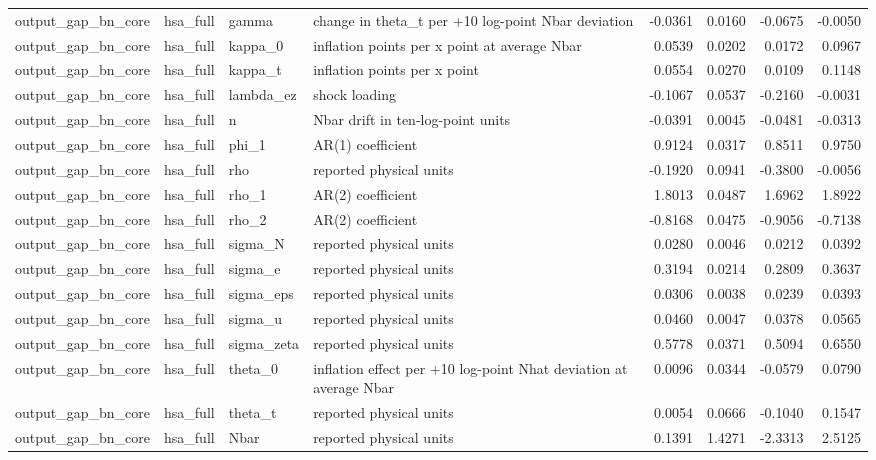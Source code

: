 \begin{tabular}{llllrrrr}
output\_gap\_bn\_core & hsa\_full & gamma & change in theta\_t per +10 log-point Nbar deviation & -0.0361 & 0.0160 & -0.0675 & -0.0050 \\
output\_gap\_bn\_core & hsa\_full & kappa\_0 & inflation points per x point at average Nbar & 0.0539 & 0.0202 & 0.0172 & 0.0967 \\
output\_gap\_bn\_core & hsa\_full & kappa\_t & inflation points per x point & 0.0554 & 0.0270 & 0.0109 & 0.1148 \\
output\_gap\_bn\_core & hsa\_full & lambda\_ez & shock loading & -0.1067 & 0.0537 & -0.2160 & -0.0031 \\
output\_gap\_bn\_core & hsa\_full & n & Nbar drift in ten-log-point units & -0.0391 & 0.0045 & -0.0481 & -0.0313 \\
output\_gap\_bn\_core & hsa\_full & phi\_1 & AR(1) coefficient & 0.9124 & 0.0317 & 0.8511 & 0.9750 \\
output\_gap\_bn\_core & hsa\_full & rho & reported physical units & -0.1920 & 0.0941 & -0.3800 & -0.0056 \\
output\_gap\_bn\_core & hsa\_full & rho\_1 & AR(2) coefficient & 1.8013 & 0.0487 & 1.6962 & 1.8922 \\
output\_gap\_bn\_core & hsa\_full & rho\_2 & AR(2) coefficient & -0.8168 & 0.0475 & -0.9056 & -0.7138 \\
output\_gap\_bn\_core & hsa\_full & sigma\_N & reported physical units & 0.0280 & 0.0046 & 0.0212 & 0.0392 \\
output\_gap\_bn\_core & hsa\_full & sigma\_e & reported physical units & 0.3194 & 0.0214 & 0.2809 & 0.3637 \\
output\_gap\_bn\_core & hsa\_full & sigma\_eps & reported physical units & 0.0306 & 0.0038 & 0.0239 & 0.0393 \\
output\_gap\_bn\_core & hsa\_full & sigma\_u & reported physical units & 0.0460 & 0.0047 & 0.0378 & 0.0565 \\
output\_gap\_bn\_core & hsa\_full & sigma\_zeta & reported physical units & 0.5778 & 0.0371 & 0.5094 & 0.6550 \\
output\_gap\_bn\_core & hsa\_full & theta\_0 & inflation effect per +10 log-point Nhat deviation at average Nbar & 0.0096 & 0.0344 & -0.0579 & 0.0790 \\
output\_gap\_bn\_core & hsa\_full & theta\_t & reported physical units & 0.0054 & 0.0666 & -0.1040 & 0.1547 \\
output\_gap\_bn\_core & hsa\_full & Nbar & reported physical units & 0.1391 & 1.4271 & -2.3313 & 2.5125 \\

\end{tabular}
